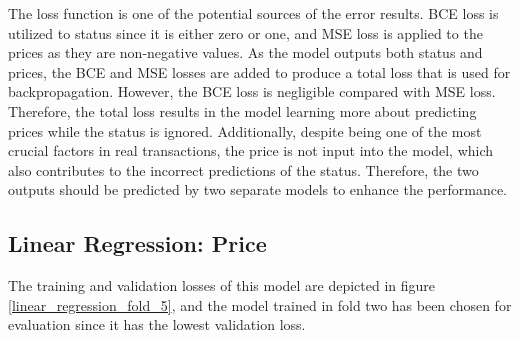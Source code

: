 \documentclass[12pt,twoside]{report}
\begin{document}
The loss function is one of the potential sources of the error results. BCE loss is utilized to status since it is either zero or one, and MSE loss is applied to the prices as they are non-negative values. As the model outputs both status and prices, the BCE and MSE losses are added to produce a total loss that is used for backpropagation. However, the BCE loss is negligible compared with MSE loss. Therefore, the total loss results in the model learning more about predicting prices while the status is ignored. Additionally, despite being one of the most crucial factors in real transactions, the price is not input into the model, which also contributes to the incorrect predictions of the status. Therefore, the two outputs should be predicted by two separate models to enhance the performance. 

\subsection{Linear Regression: Price}
The training and validation losses of this model are depicted in figure \ref{linear_regression_fold_5}, and the model trained in fold two has been chosen for evaluation since it has the lowest validation loss. 
\\
\end{document}
